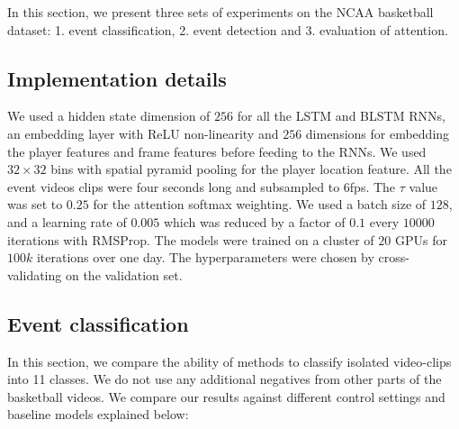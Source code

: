 In this section, we present three sets of experiments on the NCAA basketball
dataset: 1. event classification, 2. event detection and 3. evaluation of
attention.

\subsection{Implementation details}

We used a hidden state dimension of $256$ for all the LSTM and BLSTM RNNs, an
embedding layer with ReLU non-linearity and $256$ dimensions for embedding the
player features and frame features before feeding to the RNNs.  We used $32
\times 32$ bins with spatial pyramid pooling for the player location feature.
All the event videos clips were four seconds long and subsampled to 6fps.  The
$\tau$ value was set to $0.25$ for the attention softmax weighting. We used a
batch size of $128$, and a learning rate of $0.005$ which was reduced by a factor of
$0.1$ every $10000$ iterations with RMSProp\cite{RMSProp}. The models were
trained on a cluster of $20$ GPUs for $100k$ iterations over one day.  The
hyperparameters were chosen by cross-validating on the validation set.

\subsection{Event classification}

In this section, we compare the ability of methods to classify isolated
video-clips into 11 classes.  We do not use any additional
negatives from other parts of the basketball videos.  We compare our results
against different control settings and baseline models explained below:

